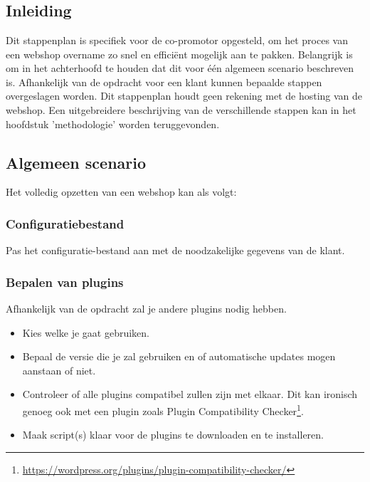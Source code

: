 
\chapter{}%
\label{ch:stappenplan}

\section{Inleiding}
Dit stappenplan is specifiek voor de co-promotor opgesteld, om het proces van een webshop overname zo snel en efficiënt mogelijk aan te pakken. Belangrijk is om in het achterhoofd te houden dat dit voor één algemeen scenario beschreven is. Afhankelijk van de opdracht voor een klant kunnen bepaalde stappen overgeslagen worden. Dit stappenplan houdt geen rekening met de hosting van de webshop. Een uitgebreidere beschrijving van de verschillende stappen kan in het hoofdstuk 'methodologie' worden teruggevonden.  

\section{Algemeen scenario}
Het volledig opzetten van een webshop kan als volgt:
\subsection{Configuratiebestand}
Pas het configuratie-bestand aan met de noodzakelijke gegevens van de klant.
\subsection{Bepalen van plugins}
Afhankelijk van de opdracht zal je andere plugins nodig hebben.
\begin{itemize}
    \item Kies welke je gaat gebruiken. 
    \item Bepaal de versie die je zal gebruiken en of automatische updates mogen aanstaan of niet.
    \item Controleer of alle plugins compatibel zullen zijn met elkaar. Dit kan ironisch genoeg ook met een plugin zoals Plugin Compatibility Checker\footnote{\href{https://wordpress.org/plugins/plugin-compatibility-checker/}{https://wordpress.org/plugins/plugin-compatibility-checker/}}.
    \item Maak script(s) klaar voor de plugins te downloaden en te installeren.
\end{itemize}
